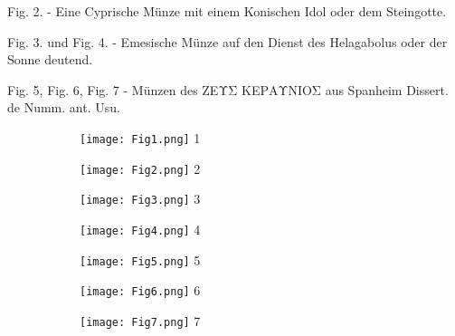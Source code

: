 \documentclass[a4paper, 11pt, oneside, polutonikogreek, german]{article}
\begin{document}
Fig. 2. - Eine Cyprische Münze mit einem Konischen Idol oder dem Steingotte.

Fig. 3. und Fig. 4. - Emesische Münze auf den Dienst des Helagabolus oder der Sonne deutend.

Fig. 5, Fig. 6, Fig. 7 - Münzen des ΖΕΥΣ ΚΕΡΑΥNIOΣ aus Spanheim Dissert. de Numm. ant. Usu.
\clearpage
\pagestyle{fancy}
\fancyhf{}
\rhead{}
\cfoot{\thepage}

\begin{figure}[h]

\begin{subfigure}{0.5\textwidth}
\texttt{[image: Fig1.png]} 1
\end{subfigure}
\begin{subfigure}{0.5\textwidth}
\texttt{[image: Fig2.png]} 2
\end{subfigure}
\begin{subfigure}{0.5\textwidth}
\texttt{[image: Fig3.png]} 3
\end{subfigure}
\begin{subfigure}{0.5\textwidth}
\texttt{[image: Fig4.png]} 4
\end{subfigure}
\begin{subfigure}{0.5\textwidth}
\texttt{[image: Fig5.png]} 5
\end{subfigure}
\begin{subfigure}{0.5\textwidth}
\texttt{[image: Fig6.png]} 6
\end{subfigure}
\begin{subfigure}{0.5\textwidth}
\texttt{[image: Fig7.png]} 7
\end{subfigure}

\end{figure}
\clearpage
\end{document}

